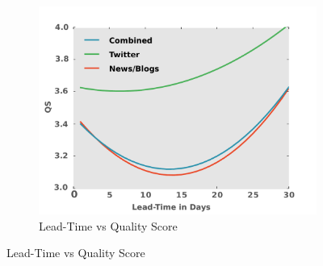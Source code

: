 \documentclass[letterpaper]{article}
\begin{document}
\begin{figure}
\begin{subfigure}{0.40\columnwidth}
    \centering
  \includegraphics[scale=0.2]{leadTimeVsQS}
  \caption{\scriptsize Lead-Time vs Quality Score}
  \label{fig:leadTimeVsQS}
\end{subfigure}


\end{figure}
\end{document}
